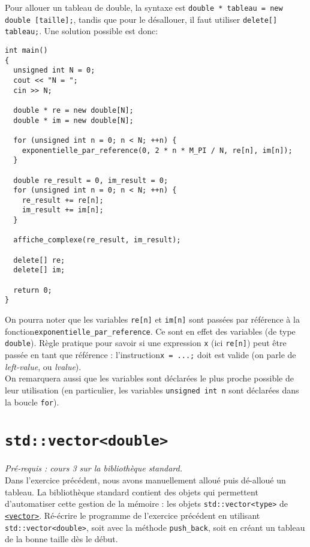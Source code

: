 \documentclass{book}
\newcommand{\inline}[1]{\texttt{#1}}
\begin{document}
\begin{correction}
Pour allouer un tableau de double, la syntaxe est \inline{double * tableau = new double [taille];}, tandis que pour le désallouer, il faut utiliser 
\inline{delete[] tableau;}. Une solution possible est donc:
\begin{verbatim}
int main() 
{
  unsigned int N = 0;
  cout << "N = ";
  cin >> N;

  double * re = new double[N];
  double * im = new double[N];

  for (unsigned int n = 0; n < N; ++n) {
    exponentielle_par_reference(0, 2 * n * M_PI / N, re[n], im[n]);
  }

  double re_result = 0, im_result = 0;
  for (unsigned int n = 0; n < N; ++n) {
    re_result += re[n];
    im_result += im[n];
  }

  affiche_complexe(re_result, im_result);

  delete[] re;
  delete[] im;

  return 0;
}
\end{verbatim}

On pourra noter que les variables \inline{re[n]} et \inline{im[n]} sont passées par référence à la fonction\linebreak \inline{exponentielle_par_reference}. Ce sont en effet des variables (de type \inline{double}). Règle pratique pour savoir si une expression \inline{x} (ici \inline{re[n]}) peut être passée en tant que référence : l'instruction\linebreak \inline{x = ...;} doit est valide (on parle de \textit{left-value}, ou \textit{lvalue}).\\

On remarquera aussi que les variables sont déclarées le plus proche possible de leur utilisation (en particulier, les variables \inline{unsigned int n} sont déclarées dans la boucle \inline{for}). 
\end{correction}

\renewenvironment{correction}{}{}

\section{\texttt{std::vector<double>}}

\emph{Pré-requis : cours 3 sur la bibliothèque standard.}\\

Dans l'exercice précédent, nous avons manuellement alloué puis dé-alloué un tableau. La bibliothèque standard contient des objets qui permettent d'automatiser cette gestion de la mémoire : les objets \inline{std::vector<type>} de \href{http://en.cppreference.com/w/cpp/header/vector}{\inline{<vector>}}. Ré-écrire le programme de l'exercice précédent en utilisant \inline{std::vector<double>}, soit avec la méthode \texttt{push\_back}, soit en créant un tableau de la bonne taille dès le début.\\
\end{document}
